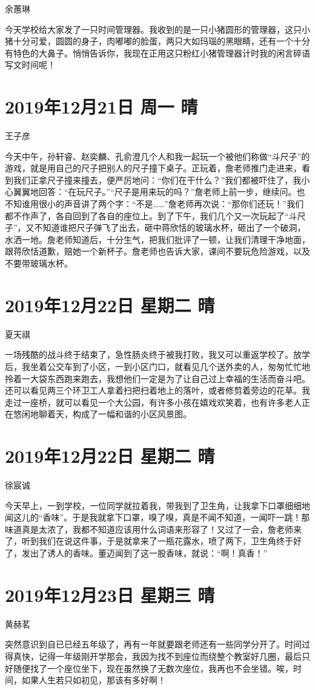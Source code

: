 余蕙琳

今天学校给大家发了一只时间管理器。我收到的是一只小猪圆形的管理器，这只小猪十分可爱，圆圆的身子，肉嘟嘟的脸蛋，两只大如玛瑙的黑眼睛，还有一个十分有特色的大鼻子。悄悄告诉你，我现在正用这只粉红小猪管理器计时我的闲言碎语写文时间呢！

\section{2019年12月21日 周一 晴}

王子彦

今天中午，孙轩睿、赵奕麟、孔俞澄几个人和我一起玩一个被他们称做``斗尺子''的游戏，就是用自己的尺子把别人的尺子撞下桌子。正玩着，詹老师推门走进来，看到我们正拿尺子撞来撞去，便严厉地问：``你们在干什么？''我们都被吓住了，我小心翼翼地回答：``在玩尺子。''``尺子是用来玩的吗？''詹老师上前一步，继续问。也不知谁用很小的声音讲了两个字：``不是\ldots\ldots{}''詹老师再次说：``那你们还玩！''我们都不作声了，各自回到了各自的座位上。到了下午，我们几个又一次玩起了``斗尺子''，又不知道谁把尺子弹飞了出去，砸中蒋欣恬的玻璃水杯，砸出了一个破洞，水洒一地。詹老师知道后，十分生气，把我们批评了一顿，让我们清理干净地面，跟蒋欣恬道歉，赔她一个新杯子。詹老师也告诉大家，课间不要玩危险游戏，以及不要带玻璃水杯。

\section{2019年12月22日 星期二 晴}

夏天祺

一场残酷的战斗终于结束了，急性肠炎终于被我打败，我又可以重返学校了。放学后，我坐着公交车到了小区，一到小区门口，就看见几个送外卖的人，匆匆忙忙地拎着一大袋东西跑来跑去，我想他们一定是为了让自己过上幸福的生活而奋斗吧。还可以看见两三个环卫工人拿着扫把扫着地上的落叶，或者修剪着旁边的花草。我走过一座桥，就可以看见一个大公园，有许多小孩在嬉戏欢笑着，也有许多老人正在悠闲地聊着天，构成了一幅和谐的小区风景图。

\section{2019年12月22日 星期二 晴}

徐宸诚

今天早上，一到学校，一位同学就拉着我，带我到了卫生角，让我拿下口罩细细地闻这儿的``香味''。于是我就拿下口罩，嗅了嗅，真是不闻不知道，一闻吓一跳！那味道真是太浓了，我都不知道应该用什么词语来形容了！又过了一会，詹老师来了，听到我们在说这件事，于是就拿来了一瓶花露水，喷了两下，卫生角终于好了，发出了诱人的香味。董迈闻到了这一股香味，就说：``啊！真香！''

\section{2019年12月23日 星期三 晴}

黄赫茗

突然意识到自已已经五年级了，再有一年就要跟老师还有一些同学分开了。时间过得真快，记得一年级刚开学那会，我因为找不到座位而绕整个教室好几圈，最后只好随便找了一个座位坐下，现在虽然换了无数次座位，我再也不会坐错。唉，时间，如果人生若只如初见，那该有多好啊！
